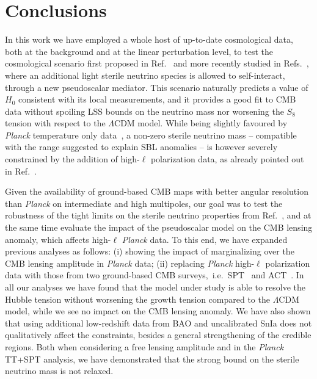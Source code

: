 \documentclass[a4paper,11pt]{article}
\begin{document}
\section{Conclusions}\label{sec:concl}

{In this work we have employed} a whole host of up-to-date cosmological data, both at the background and at the linear perturbation level,
{to test the} cosmological scenario first proposed in Ref.~\cite{Archidiacono:2014nda} and more recently studied in Refs.~\cite{Archidiacono:2015oma,Archidiacono:2016kkh,Archidiacono:2020yey}, where an additional light sterile neutrino species is allowed to self-interact, through a new pseudoscalar mediator. 
This scenario naturally predicts a value of $H_0$ consistent with its local measurements, and it provides a good fit to CMB data without spoiling LSS bounds on the neutrino mass nor worsening the $S_8$ tension with respect to the $\Lambda$CDM model.
{While being slightly favoured by \emph{Planck} temperature only data~\cite{Archidiacono:2016kkh},}
a non-zero sterile neutrino mass -- compatible with the range suggested to explain SBL anomalies -- is however severely constrained by the addition of high-$\ell$ polarization data, {as already pointed out in} Ref.~\cite{Archidiacono:2020yey}.

Given the availability of ground-based CMB maps with better angular resolution than \emph{Planck} on intermediate and high multipoles, our goal was to test the robustness of the tight limits on the sterile neutrino properties from Ref.~\cite{Archidiacono:2020yey}, and at the same time evaluate the impact of the pseudoscalar model on the CMB lensing anomaly, which affects high-$\ell$ \emph{Planck} data.
To this end, we have expanded previous analyses as follows:
(i) showing the impact of marginalizing over the CMB lensing {amplitude} in \emph{Planck} data;
(ii) replacing \emph{Planck} high-$\ell$ polarization data with those from two ground-based CMB surveys,~i.e.~SPT~\cite{Henning:2017nuy} and ACT~\cite{Aiola:2020azj}.
In all our analyses we have found that the model under study is able to resolve the Hubble tension without worsening the growth tension compared to the $\Lambda$CDM model, while we see no impact on the CMB lensing anomaly.
We have also shown that using additional low-redshift data from BAO and uncalibrated SnIa does not qualitatively affect the constraints, besides a general strengthening {of the credible regions}.
Both {when considering a free lensing amplitude} and in the \emph{Planck} TT+SPT analysis, we have demonstrated that the strong bound on the sterile neutrino mass is not relaxed.
\end{document}
